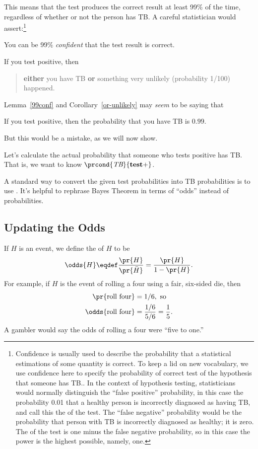 This means that the test produces the correct result at least 99\% of
the time, regardless of whether or not the person has TB.  A careful
statistician would assert:\footnote{Confidence is usually used to describe
  the probability that a statistical estimations of some quantity is
  correct.  To keep a lid on new vocabulary, we use confidence here to
  specify the probability of correct test of the hypothesis that
  someone has TB..  In the context of hypothesis testing,
  statisticians would normally distinguish the ``false positive''
  probability, in this case the probability 0.01 that a healthy person
  is incorrectly diagnosed as having TB, and call this the
   of the test.  The ``false negative'' probability
  would be the probability that person with TB is incorrectly
  diagnosed as healthy; it is zero.  The  of the test is
  one minus the false negative probability, so in this case the power
  is the highest possible, namely, one.}
\begin{lemma*}\label{99conf}
You can be 99\% \emph{confident} that the test result is correct.
\end{lemma*}
\begin{corollary}\label{or-unlikely}
If you test positive, then
\begin{quote}
\textbf{either} you have TB \textbf{or} something very unlikely
(probability 1/100) happened.
\end{quote}
\end{corollary}
Lemma~\ref{99conf} and Corollary~\ref{or-unlikely} may \emph{seem} to
be saying that
\begin{falseclm*}
If you test positive, then the probability that you have TB is $0.99$.
\end{falseclm*}
But this would be a mistake, as we will now show.

Let's calculate the actual probability that someone who tests positive
has TB.  That is, we want to know $\prcond{\TB}{\testplus}$.

A standard way to convert the given test probabilities into TB
probabilities is to use .  It's helpful to rephrase
Bayes Theorem in terms of ``odds'' instead of probabilities.

\subsection{Updating the Odds}
If $H$ is an event, we define the  of $H$ to be
\[
\odds{H} \eqdef \frac{\pr{H}}{\pr{\bar{H}}} = \frac{\pr{H}}{1-\pr{H}}.
\]
For example, if $H$ is the event of rolling a four using a fair,
six-sided die, then
\begin{align*}
\pr{\text{roll four}} & = 1/6,\text{ so}\\
\odds{\text{roll four}} & = \frac{1/6}{5/6} = \frac{1}{5}.
\end{align*}
A gambler would say the odds of rolling a four were ``five to one.''


